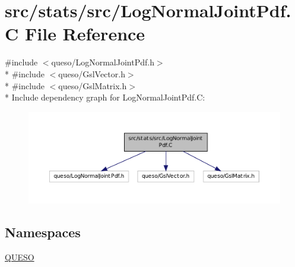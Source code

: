 \hypertarget{_log_normal_joint_pdf_8_c}{\section{src/stats/src/\-Log\-Normal\-Joint\-Pdf.C File Reference}
\label{_log_normal_joint_pdf_8_c}
}
{\ttfamily \#include $<$queso/\-Log\-Normal\-Joint\-Pdf.\-h$>$}\\*
{\ttfamily \#include $<$queso/\-Gsl\-Vector.\-h$>$}\\*
{\ttfamily \#include $<$queso/\-Gsl\-Matrix.\-h$>$}\\*
Include dependency graph for Log\-Normal\-Joint\-Pdf.\-C\-:
\nopagebreak
\begin{figure}[H]
\begin{center}
\leavevmode
\includegraphics[width=350pt]{_log_normal_joint_pdf_8_c__incl}
\end{center}
\end{figure}
\subsection*{Namespaces}
\begin{DoxyCompactItemize}
\item 
\hyperlink{namespace_q_u_e_s_o}{Q\-U\-E\-S\-O}
\end{DoxyCompactItemize}
